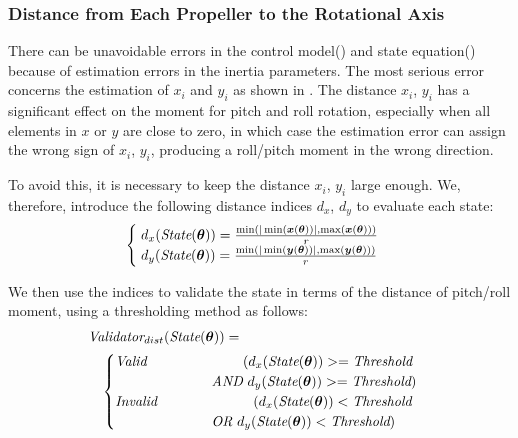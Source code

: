 \subsubsection{Distance from Each Propeller to the Rotational Axis}
There can be unavoidable errors in the control model() and state equation() because of estimation errors in the inertia parameters. The most serious error concerns the estimation of $x_i$ and $y_i$ as shown in . The distance $x_i$, $y_i$ has a significant effect on the moment for pitch and roll rotation, especially when all elements in $x$ or $y$ are close to zero, in which case the estimation error can assign the wrong sign of $x_i$, $y_i$, producing a roll/pitch moment in the wrong direction.
\par
To avoid this, it is necessary to keep the distance $x_i$, $y_i$ large enough. We, therefore, introduce the following distance indices $d_x$, $d_y$ to evaluate each state:
\begin{equation}
  \begin{cases}
    \; d_x(\text{\it{State}}(\bm{\theta})) = \frac{\min(|\min(\bm{x}(\bm{\theta}))|,\max(\bm{x}(\bm{\theta})))}{r}\\
    \; d_y(\text{\it{State}}(\bm{\theta})) = \frac{\min(|\min(\bm{y}(\bm{\theta}))|,\max(\bm{y}(\bm{\theta})))}{r}\\
  \end{cases}
  \label{eq:dx_dy}
\end{equation}
\par
We then use the indices to validate the state in terms of the distance of pitch/roll moment, using a thresholding method as follows:
\begin{equation}
  \begin{split}
  \text{\it{Validator}}_{dist}(\text{\it{State}}(\bm{\theta}))= \hspace{0.4\columnwidth} \\
  \begin{cases}
  \text{\it{Valid}} \hspace{0.2\columnwidth}(d_x(\text{\it{State}}(\bm{\theta})) >= \text{\it{Threshold}} \\
  \hspace{0.2\columnwidth} \text{\it{AND}} \ d_y(\text{\it{State}}(\bm{\theta})) >= \text{\it{Threshold}})\\
  \text{\it{Invalid}} \hspace{0.2\columnwidth} (d_x(\text{\it{State}}(\bm{\theta})) < \text{\it{Threshold}} \\ 
  \hspace{0.2\columnwidth} \text{\it{OR}} \ d_y(\text{\it{State}}(\bm{\theta})) < \text{\it{Threshold}})
  \end{cases}
  \end{split}
  \label{eq:dx_dy_thresh}
\end{equation}
